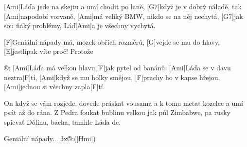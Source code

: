 
[Ami]Láďa jede na skejtu
a umí chodit po laně,
[G7]když je v dobrý náladě,
tak [Ami]napodobí vorvaně,
[Ami]má veliký BMW,
nikdo se na něj nechytá,
[G7]jak sou ňáký problémy,
Láď[Ami]a je všechny vychytá.

[F]Geniální nápady má, mozek obřích rozměrů,
[G]vejde se mu do hlavy, [E]jestlipak víte proč!
Protože

®: [Ami]Láďa má velkou hlavu,[F]jak pytel od banánů,
[Ami]Láďa se v davu neztra[F]tí,
[Ami]když se mu holky smějou,
[F]prachy ho v kapse hřejou,
[Ami]jednou si všechny zapla[F]tí.

On když se vám rozjede,
dovede práskat vousama
a k tomu metat kozelce
a umí psát až do rána.
Z Pedra foukat bublinu
velkou jak půl Zimbabwe,
pa rusky spievať Dólinu,
bacha, tamhle Láďa de.

Geniální nápady... 3x®:([Hmi])



